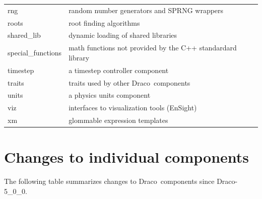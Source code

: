 \documentclass[note]{ResearchNote}
\newcommand{\draco}{Draco}
\newcommand{\dracor}{\draco-6\_0\_0}
\newcommand{\tableText}[1]{{\raggedright #1}}
\begin{document}
\begin{center}
\begin{tabular}{lp{4.0in}}
    rng          & \tableText{random number generators and SPRNG wrappers} \\
    roots        & \tableText{root finding algorithms} \\
    shared\_lib  & \tableText{dynamic loading of shared libraries} \\
    special\_functions & \tableText{math functions not provided by the
      C++ standardard library} \\
    timestep     & \tableText{a timestep controller component} \\
    traits       & \tableText{traits used by other \draco\ components} \\
    units        & \tableText{a physics units component} \\
    viz          & \tableText{interfaces to visualization tools (EnSight)} \\
    xm           & \tableText{glommable expression templates} \\  

    \hline\hline 
  \end{tabular}
\end{center}

\section{Changes to individual components}
\label{sec:changes}
The following table summarizes changes to \draco\ components since
\draco-5\_0\_0. 
\end{document}
